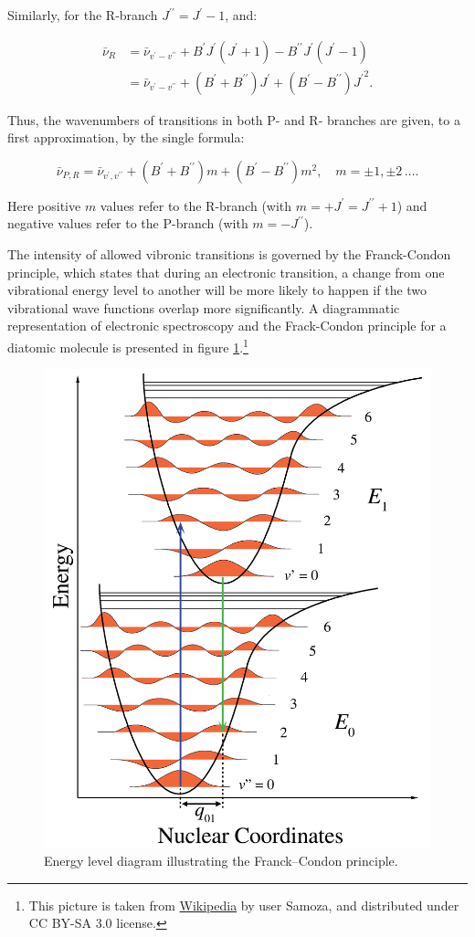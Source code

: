 \documentclass[
  9pt,
]{extbook}
\theoremstyle{definition}
\theoremstyle{definition}
\theoremstyle{definition}
\theoremstyle{remark}
\begin{document}
Similarly, for the R-branch \(J^{\prime\prime }=J^{{\prime }}-1\), and:

\begin{equation}
\begin{aligned}
{\bar  \nu }_{R} &={\bar  \nu}_{{v^{\prime}-v^{\prime\prime}}}+B^{\prime}J^{\prime}(J^{\prime}+1)-B^{\prime\prime}J^{\prime}(J^{\prime}-1) \\
&={\bar  \nu }_{{v^{\prime}-v^{\prime\prime}}}+(B^{\prime}+B^{\prime\prime})J^{\prime}+(B^{\prime}-B^{\prime\prime}){J^{\prime}}^{2}.
\end{aligned}
\label{eq:elec3}
\end{equation}

Thus, the wavenumbers of transitions in both P- and R- branches are given, to a first approximation, by the single formula:

\begin{equation}
{\bar  \nu }_{{P,R}}={\bar  \nu }_{{v^{\prime },v^{{\prime \prime }}}}+(B^{\prime }+B^{{\prime \prime }})m+(B^{\prime }-B^{{\prime \prime }})m^{2},\quad m=\pm 1,\pm 2\, \ldots.
\label{eq:elec4}
\end{equation}

Here positive \(m\) values refer to the R-branch (with \(m=+J^{\prime}=J^{\prime\prime}+1\)) and negative values refer to the P-branch (with \(m=-J^{\prime\prime}\)).

The intensity of allowed vibronic transitions is governed by the Franck-Condon principle, which states that during an electronic transition, a change from one vibrational energy level to another will be more likely to happen if the two vibrational wave functions overlap more significantly. A diagrammatic representation of electronic spectroscopy and the Frack-Condon principle for a diatomic molecule is presented in figure \ref{fig:Fig4c13}.\footnote{This picture is taken from \href{https://en.wikipedia.org/wiki/Franck–Condon_principle\#/media/File:Franck_Condon_Diagram.svg}{Wikipedia} by user Samoza, and distributed under CC BY-SA 3.0 license.}

\begin{figure}

{\centering \includegraphics[width=0.7\linewidth]{./img/OEP_wiki8} 

}

\caption{Energy level diagram illustrating the Franck–Condon principle.}\label{fig:Fig4c13}
\end{figure}
\end{document}
